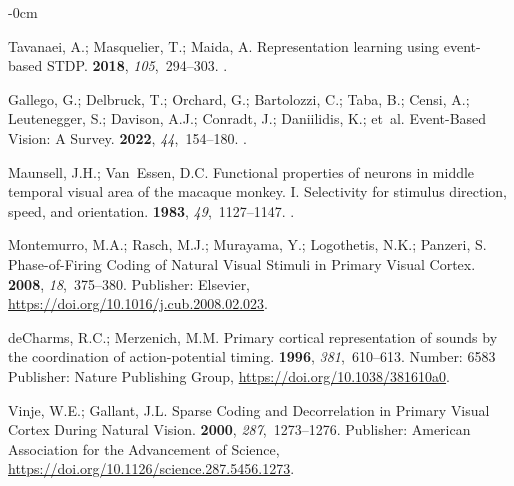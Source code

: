 \documentclass[brainsci, %
               review,submit,pdftex,moreauthors
               ]{Definitions/mdpi}
\begin{document}
\begin{adjustwidth}{-\extralength}{0cm}
\begin{thebibliography}{999}
  Tavanaei, A.; Masquelier, T.; Maida, A.
  \newblock Representation learning using event-based {STDP}.
   {\bf 2018}, {\em 105},~294--303.
  .
  
  Gallego, G.; Delbruck, T.; Orchard, G.; Bartolozzi, C.; Taba, B.; Censi, A.;
    Leutenegger, S.; Davison, A.J.; Conradt, J.; Daniilidis, K.;  et~al.
  \newblock Event-{Based} {Vision}: {A} {Survey}.
    {\bf 2022}, {\em 44},~154--180.
  .
  
  Maunsell, J.H.; Van~Essen, D.C.
  \newblock Functional properties of neurons in middle temporal visual area of
    the macaque monkey. {I}. {Selectivity} for stimulus direction, speed, and
    orientation.
   {\bf 1983}, {\em 49},~1127--1147.
  .
  
  Montemurro, M.A.; Rasch, M.J.; Murayama, Y.; Logothetis, N.K.; Panzeri, S.
  \newblock Phase-of-{Firing} {Coding} of {Natural} {Visual} {Stimuli} in
    {Primary} {Visual} {Cortex}.
   {\bf 2008}, {\em 18},~375--380.
  \newblock Publisher: Elsevier,
    {\url{https://doi.org/10.1016/j.cub.2008.02.023}}.
  
  deCharms, R.C.; Merzenich, M.M.
  \newblock Primary cortical representation of sounds by the coordination of
    action-potential timing.
   {\bf 1996}, {\em 381},~610--613.
  \newblock Number: 6583 Publisher: Nature Publishing Group,
    {\url{https://doi.org/10.1038/381610a0}}.
  
  Vinje, W.E.; Gallant, J.L.
  \newblock Sparse {Coding} and {Decorrelation} in {Primary} {Visual} {Cortex}
    {During} {Natural} {Vision}.
   {\bf 2000}, {\em 287},~1273--1276.
  \newblock Publisher: American Association for the Advancement of Science,
    {\url{https://doi.org/10.1126/science.287.5456.1273}}.
  

\end{thebibliography}
\end{adjustwidth}
\end{document}
